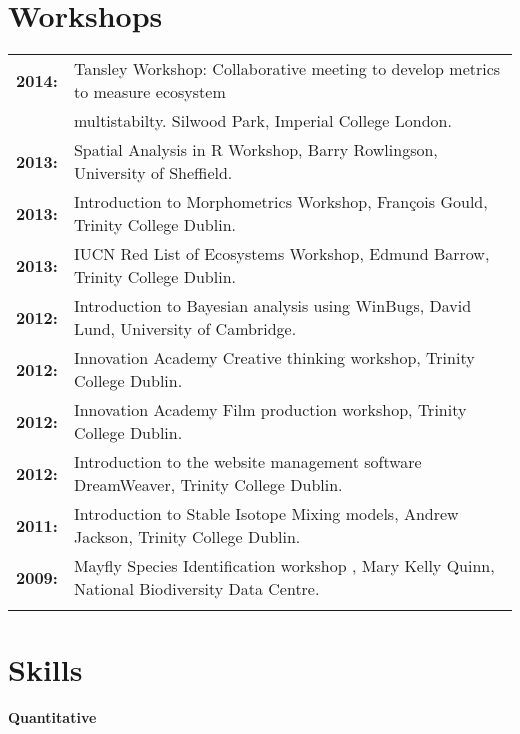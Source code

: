 \documentclass[10pt,a4paper]{article}
\begin{document}
\section{Workshops}

\begin{tabular}{ll}
\textbf{2014:} & Tansley Workshop: Collaborative meeting to develop metrics to measure ecosystem\\
&multistabilty. Silwood Park, Imperial College London.\\
\textbf{2013:} & Spatial Analysis in R Workshop, Barry Rowlingson, University of Sheffield.\\
\textbf{2013:} & Introduction to Morphometrics Workshop, François Gould, Trinity College Dublin.\\
\textbf{2013:} & IUCN Red List of Ecosystems Workshop, Edmund Barrow, Trinity College Dublin.\\
\textbf{2012:} & Introduction to Bayesian analysis using WinBugs, David Lund, University of Cambridge.\\
\textbf{2012:} & Innovation Academy Creative thinking workshop, Trinity College Dublin.\\
\textbf{2012:} & Innovation Academy Film production workshop, Trinity College Dublin.\\
\textbf{2012:} & Introduction to the website management software DreamWeaver, Trinity College Dublin.\\
\textbf{2011:} & Introduction to Stable Isotope Mixing models, Andrew Jackson, Trinity College Dublin.\\
\textbf{2009:} & Mayfly Species Identification workshop , Mary Kelly Quinn, National Biodiversity Data Centre.\\
&\\
\end{tabular}

\bigskip
\newpage
\bigskip
\section{Skills}

\raggedright\textbf{Quantitative}\\
\end{document}
